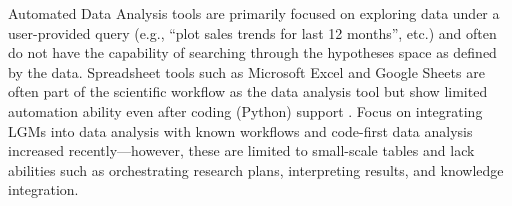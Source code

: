 
Automated Data Analysis tools are primarily focused on exploring data under a user-provided query (e.g., ``plot sales trends for last 12 months'', etc.) and often do not have the capability of searching through the hypotheses space as defined by the data.
Spreadsheet tools such as Microsoft Excel and Google Sheets are often part of the scientific workflow as the data analysis tool but show limited automation ability even after coding (Python) support \cite{PYExcel, duetai}. Focus on integrating LGMs into data analysis with known workflows \cite{Perlitz2022nBIIGAN, Chakraborty2024NavigatorAG}  and code-first data analysis \cite{ydata} increased recently---however, these are limited to small-scale tables and lack abilities such as orchestrating research plans, interpreting results, and knowledge integration. 